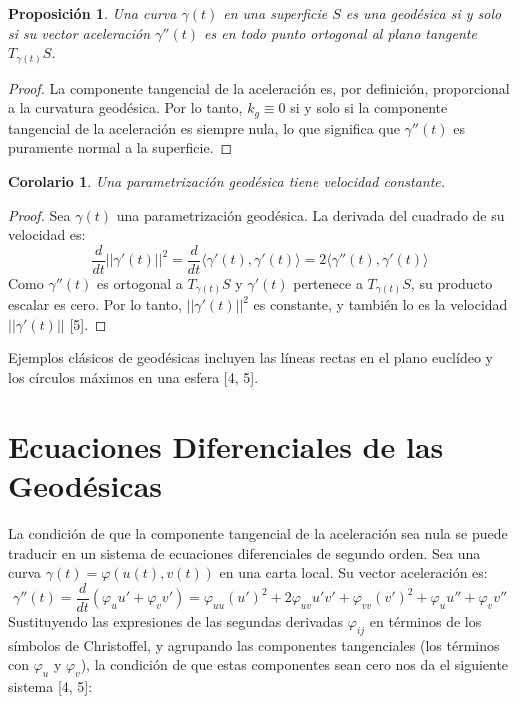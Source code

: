 \documentclass[12pt, a4paper]{report}
\theoremstyle{miestilo}
\newtheorem{proposicion}[teorema]{Proposición}
\newtheorem{corolario}[teorema]{Corolario}
\theoremstyle{midefinicion}
\begin{document}
\begin{proposicion}
Una curva $\gamma(t)$ en una superficie $S$ es una geodésica si y solo si su vector aceleración $\gamma''(t)$ es en todo punto ortogonal al plano tangente $T_{\gamma(t)}S$.
\end{proposicion}

\begin{proof}
La componente tangencial de la aceleración es, por definición, proporcional a la curvatura geodésica. Por lo tanto, $k_g \equiv 0$ si y solo si la componente tangencial de la aceleración es siempre nula, lo que significa que $\gamma''(t)$ es puramente normal a la superficie.
\end{proof}

\begin{corolario}
Una parametrización geodésica tiene velocidad constante.
\end{corolario}
\begin{proof}
Sea $\gamma(t)$ una parametrización geodésica. La derivada del cuadrado de su velocidad es:
$$ \frac{d}{dt} ||\gamma'(t)||^2 = \frac{d}{dt} \langle \gamma'(t), \gamma'(t) \rangle = 2 \langle \gamma''(t), \gamma'(t) \rangle $$
Como $\gamma''(t)$ es ortogonal a $T_{\gamma(t)}S$ y $\gamma'(t)$ pertenece a $T_{\gamma(t)}S$, su producto escalar es cero. Por lo tanto, $||\gamma'(t)||^2$ es constante, y también lo es la velocidad $||\gamma'(t)||$ [5].
\end{proof}

Ejemplos clásicos de geodésicas incluyen las líneas rectas en el plano euclídeo y los círculos máximos en una esfera [4, 5].

\section{Ecuaciones Diferenciales de las Geodésicas}

La condición de que la componente tangencial de la aceleración sea nula se puede traducir en un sistema de ecuaciones diferenciales de segundo orden. Sea una curva $\gamma(t) = \varphi(u(t), v(t))$ en una carta local. Su vector aceleración es:
$$ \gamma''(t) = \frac{d}{dt}(\varphi_u u' + \varphi_v v') = \varphi_{uu}(u')^2 + 2\varphi_{uv}u'v' + \varphi_{vv}(v')^2 + \varphi_u u'' + \varphi_v v'' $$
Sustituyendo las expresiones de las segundas derivadas $\varphi_{ij}$ en términos de los símbolos de Christoffel, y agrupando las componentes tangenciales (los términos con $\varphi_u$ y $\varphi_v$), la condición de que estas componentes sean cero nos da el siguiente sistema [4, 5]:
\end{document}
